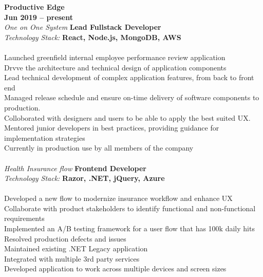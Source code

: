 \documentclass[margin,line]{resume}
\begin{document}
\begin{resume}
    \textbf{\listing Productive Edge} \vspace{2mm}\\\vspace{1mm} \hfill \textbf{Jun 2019 -- present}\\
    \textsl{One on One System}  \hfill \textbf{Lead Fullstack Developer}\\
    \textsl{Technology Stack:‎} \hfill \textbf{React, Node.js, MongoDB, AWS}\\\\
    Launched greenfield internal employee performance review application\\
    Drvve the architecture and technical design of application components\\
    Lead technical development of complex application features, from back to front end\\
    Managed release schedule and ensure on-time delivery of software components to production.\\
    Colloborated with designers and users to be able to apply the best suited UX.\\
    Mentored junior developers in best practices, providing guidance for implementation strategies\\
    Currently in production use by all members of the company\\
    \textbf{\listing} \vspace{2mm}\\\vspace{1mm}%
    \textsl{Health Insurance flow}  \hfill \textbf{Frontend Developer}\\
    \textsl{Technology Stack:‎} \hfill \textbf{Razor, .NET, jQuery, Azure}\\\\
    Developed a new flow to modernize insurance workflow and enhance UX\\
    Collaborate with product stakeholders to identify functional and non-functional requirements\\
    Implemented an A/B testing framework for a user flow that has 100k daily hits\\
    Resolved production defects and issues\\
    Maintained existing .NET Legacy application\\
    Integrated with multiple 3rd party services\\ 
    Developed application to work across multiple devices and screen sizes\\

\end{resume}
\end{document}
